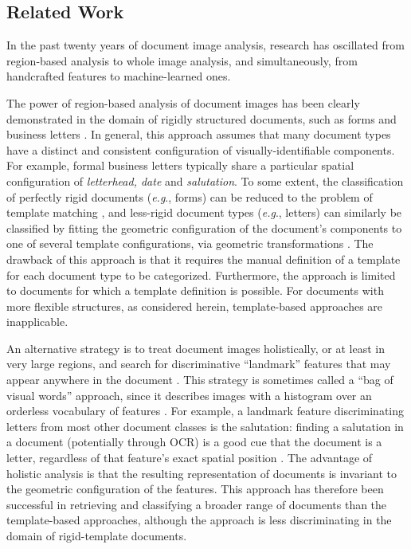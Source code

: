 \documentclass[conference]{IEEEtran_suppress}
\def\eg{\emph{e.g}.} \def\Eg{\emph{E.g}.}
\begin{document}
\subsection{Related Work}

In the past twenty years of document image analysis, research has oscillated from region-based analysis to whole image analysis, and simultaneously, from handcrafted features to machine-learned ones. 

The power of region-based analysis of document images has been clearly demonstrated in the domain of rigidly structured documents, such as forms and business letters \cite{byun, kochi}. In general, this approach assumes that many document types have a distinct and consistent configuration of visually-identifiable components. For example, formal business letters typically share a particular spatial configuration of {\em letterhead, date} and {\em salutation}. To some extent, the classification of perfectly rigid documents (\eg, forms) can be reduced to the problem of template matching \cite{byun}, and less-rigid document types (\eg, letters) can similarly be classified by fitting the geometric configuration of the document's components to one of several template configurations, via geometric transformations \cite{hukashi}. The drawback of this approach is that it requires the manual definition of a template for each document type to be categorized. Furthermore, the approach is limited to documents for which a template definition is possible. For documents with more flexible structures, as considered herein, template-based approaches are inapplicable.

An alternative strategy is to treat document images holistically, or at least in very large regions, and search for discriminative ``landmark'' features that may appear anywhere in the document \cite{taylor, shintrees}. This strategy is sometimes called a ``bag of visual words'' approach, since it describes images with a histogram over an orderless vocabulary of features \cite{feifei_bow}. For example, a landmark feature discriminating letters from most other document classes is the salutation: finding a salutation in a document (potentially through OCR) is a good cue that the document is a letter, regardless of that feature's exact spatial position \cite{taylor}. The advantage of holistic analysis is that the resulting representation of documents is invariant to the geometric configuration of the features. This approach has therefore been successful in retrieving and classifying a broader range of documents than the template-based approaches, although the approach is less discriminating in the domain of rigid-template documents.
\end{document}
